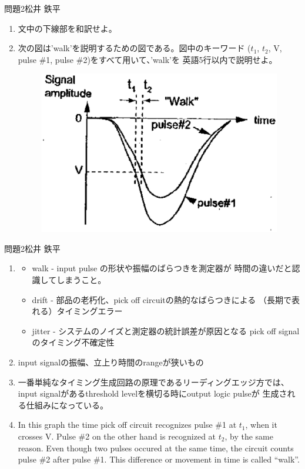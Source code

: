\documentclass[fleqn]{jbook}
\begin{document}
\begin{question}{問題2}{松井 鉄平}
\begin{enumerate}
\item 文中の下線部を和訳せよ。

\item 次の図は'walk'を説明するための図である。図中のキーワード
($t_1$, $t_2$, V, pulse \#1, pulse \#2)をすべて用いて、'walk'を
英語5行以内で説明せよ。
\begin{figure}[htbp]
\begin{center}
\includegraphics[width=.5\linewidth]{2002engl2.eps}
\end{center}
\end{figure}

\end{enumerate}
\end{question}

\begin{answer}{問題2}{松井 鉄平}
\begin{enumerate}
\item \begin{itemize}
\item walk - input pulse の形状や振幅のばらつきを測定器が
時間の違いだと認識してしまうこと。

\item drift - 部品の老朽化、pick off circuitの熱的なばらつきによる
（長期で表れる）タイミングエラー
 
\item jitter - システムのノイズと測定器の統計誤差が原因となる
pick off signal のタイミング不確定性
\end{itemize}

\item input signalの振幅、立上り時間のrangeが狭いもの

\item 一番単純なタイミング生成回路の原理であるリーディングエッジ方では、
input signalがあるthreshold levelを横切る時にoutput logic pulseが
生成される仕組みになっている。

\item In this graph the time pick off circuit recognizes pulse \#1 at $t_1$, 
when it crosses V. Pulse \#2 on the other hand is recognized at $t_2$, 
by the same reason. Even though two pulses occured at the same time, 
the circuit counts pulse \#2 after pulse \#1. This difference or movement in 
time is called ``walk''.

\end{enumerate}
\end{answer}
\end{document}
